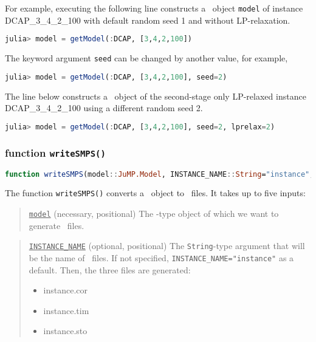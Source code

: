 For example, executing the following line constructs a \jumpmodel\ object \texttt{model} of instance DCAP\_3\_4\_2\_100 with default random seed 1 and without LP-relaxation.
\begin{lstlisting}[frame=single,language=julia]
julia> model = getModel(:DCAP, [3,4,2,100])
\end{lstlisting}
The keyword argument \texttt{seed} can be changed by another value, for example,
\begin{lstlisting}[frame=single,language=julia]
julia> model = getModel(:DCAP, [3,4,2,100], seed=2)
\end{lstlisting}
The line below constructs a \jumpmodel\ object of the second-stage only LP-relaxed instance DCAP\_3\_4\_2\_100 using a different random seed 2.
\begin{lstlisting}[frame=single,language=julia]
julia> model = getModel(:DCAP, [3,4,2,100], seed=2, lprelax=2)
\end{lstlisting}




\subsubsection{function \texttt{writeSMPS()}}
\begin{lstlisting}[frame=single,language=julia]
function writeSMPS(model::JuMP.Model, INSTANCE_NAME::String="instance", DIR_NAME::String="$(dirname(@__FILE__))/../instance"; genericnames::Bool=true, splice::Bool=true)
\end{lstlisting}
The function \texttt{writeSMPS()} converts a \jumpmodel\ object to \smps\ files. It takes up to five inputs:

\begin{quote}
	\noindent\underline{\texttt{model}} (necessary, positional) The \jumpmodel-type object of which we want to generate \smps\ files.
\end{quote}

\begin{quote}
	\noindent\underline{\texttt{INSTANCE\_NAME}} (optional, positional) The \texttt{String}-type argument that will be the name of \smps\ files. If not specified, \texttt{INSTANCE\_NAME="instance"} as a default. Then, the three files are generated:
	\begin{itemize}
		\item instance.cor
		\item instance.tim
		\item instance.sto
	\end{itemize}
\end{quote}

